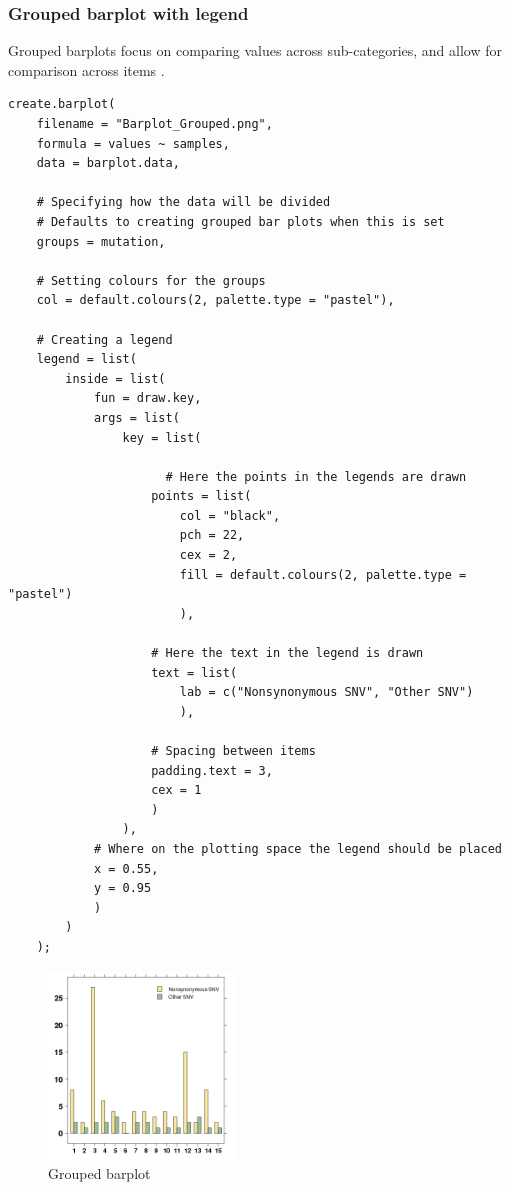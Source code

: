 \documentclass[letterpaper]{article}
\begin{document}
\subsubsection{Grouped barplot with legend}
Grouped barplots focus on comparing values across sub-categories, and allow  for comparison across items \cite{streit}.

\begin{verbatim}
create.barplot(
    filename = "Barplot_Grouped.png",
    formula = values ~ samples,
    data = barplot.data,
    
    # Specifying how the data will be divided
    # Defaults to creating grouped bar plots when this is set
    groups = mutation,
    
    # Setting colours for the groups
    col = default.colours(2, palette.type = "pastel"),
    
    # Creating a legend 
    legend = list(
        inside = list(
            fun = draw.key,
            args = list(
                key = list(
                	
                	  # Here the points in the legends are drawn
                    points = list(
                        col = "black",
                        pch = 22,
                        cex = 2,
                        fill = default.colours(2, palette.type = "pastel")
                        ),

                    # Here the text in the legend is drawn
                    text = list(
                        lab = c("Nonsynonymous SNV", "Other SNV")
                        ),

                    # Spacing between items
                    padding.text = 3,
                    cex = 1
                    )
                ),
            # Where on the plotting space the legend should be placed
            x = 0.55,
            y = 0.95
            )
        )
    );
\end{verbatim}

\begin{figure}[!ht]
  \begin{center}
     \includegraphics[width=50mm]{Figures/Barplot_Grouped.png}
     \caption{Grouped barplot}
  \end{center}
\end{figure}
\end{document}
